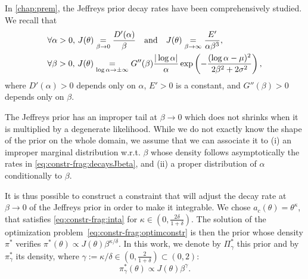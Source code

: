 In   \cref{chap:prem}, the Jeffreys prior decay rates have been comprehensively studied.
We recall that
    \begin{align}\label{eq:constr-frag:decaysJbeta}
        &\forall\alpha>0,\, J(\theta) \overset{}{\underset{\beta\rightarrow0}{=}}\frac{D'(\alpha)}{\beta}\quad\text{and}\quad J(\theta)\overset{}{\underset{\beta\rightarrow\infty}{=}}\frac{E'}{\alpha\beta^3}, \\
        &\forall\beta>0,\,J(\theta) \overset{}{\underset{\log\alpha\rightarrow\pm\infty}{=}}G''(\beta)\frac{|\log\alpha|}{\alpha}\exp\left(-\frac{(\log\alpha-\mu)^2}{2\beta^2+2\sigma^2}\right),\label{eq:constr-frag:decaysJalpha}
    \end{align}
where $D'(\alpha)>0$ depends only on $\alpha$, $E'>0$ is a constant, and $G''(\beta)>0$ depends only on $\beta$.

The Jeffreys prior has an improper tail at $\beta\to0$ which does not shrinks when it is multiplied by a degenerate likelihood.
While we do not exactly know the shape of the prior on the whole domain, we assume that we can associate it to (i) an improper marginal distribution w.r.t. $\beta$ whose density follows asymptotically the rates in \cref{eq:constr-frag:decaysJbeta}, and (ii) a proper distribution of $\alpha$ conditionally to $\beta$.



It is thus possible to construct a constraint that will adjust the decay rate at $\beta\to0$ of the Jeffreys prior in order to make it integrable.
We chose $a_c(\theta)=\theta^\kappa$, that satisfies \cref{eq:constr-frag:inta} for $\kappa\in(0,\frac{2\delta}{1+\delta})$. 
The solution of the optimization problem~\eqref{eq:constr-frag:optimconstr} is then the prior whose density $\pi^\ast$ verifies $\pi^\ast(\theta)\propto J(\theta)\beta^{\kappa/\delta}$. In this work, we denote by $\varPi^\ast_\gamma$ this prior and by $\pi^\ast_\gamma$ its density, where $\gamma:=\kappa/\delta\in(0,\frac{2}{1+\delta})\subset(0,2)$:
    \begin{equation}
        \pi^\ast_\gamma(\theta) \propto J(\theta)\beta^\gamma.
    \end{equation}









